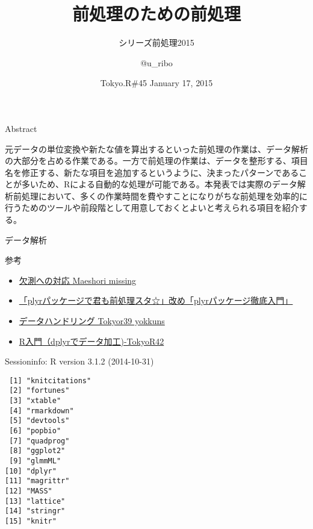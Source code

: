 \documentclass[17pt,ignorenonframetext,]{beamer}
\title{前処理のための前処理}
\subtitle{シリーズ前処理2015}
\author{@u\_ribo}
\date{Tokyo.R\#45 January 17, 2015}
\begin{document}
\frame{\titlepage}

\begin{frame}{Abstract}

元データの単位変換や新たな値を算出するといった前処理の作業は、データ解析の大部分を占める作業である。一方で前処理の作業は、データを整形する、項目名を修正する、新たな項目を追加するというように、決まったパターンであることが多いため、Rによる自動的な処理が可能である。本発表では実際のデータ解析前処理において、多くの作業時間を費やすことになりがちな前処理を効率的に行うためのツールや前段階として用意しておくとよいと考えられる項目を紹介する。

\end{frame}

\begin{frame}{データ解析}


\end{frame}

\begin{frame}{参考}

\begin{itemize}
\itemsep1pt\parskip0pt
\item
  \href{http://www.slideshare.net/dichika/maeshori-missing}{欠測への対応
  Maeshori missing}
\item
  \href{http://www.slideshare.net/teramonagi/tokyo-r30-20130420}{「plyrパッケージで君も前処理スタ☆」改め「plyrパッケージ徹底入門」}
\item
  \href{http://www.slideshare.net/yokkuns/tokyor39-yokkuns}{データハンドリング
  Tokyor39 yokkuns}
\item
  \href{http://www.slideshare.net/gepuro/rdplyrtokyor42}{R入門（dplyrでデータ加工)-TokyoR42}
\end{itemize}

\end{frame}

\begin{frame}[fragile]{\small{Sessioninfo: R version 3.1.2 (2014-10-31)}}

\begin{verbatim}
 [1] "knitcitations"
 [2] "fortunes"     
 [3] "xtable"       
 [4] "rmarkdown"    
 [5] "devtools"     
 [6] "popbio"       
 [7] "quadprog"     
 [8] "ggplot2"      
 [9] "glmmML"       
[10] "dplyr"        
[11] "magrittr"     
[12] "MASS"         
[13] "lattice"      
[14] "stringr"      
[15] "knitr"        
\end{verbatim}

\end{frame}
\end{document}
